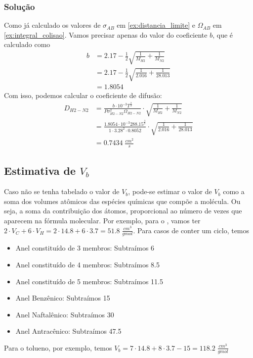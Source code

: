 \subsubsection{Solução}
Como já calculado os valores de \(\sigma_{AB} \) em \ref{ex:distancia_limite} e \(\Omega_{AB}\) em
\ref{ex:integral_colisao}. Vamos precisar apenas do valor do coeficiente \(b\), que é calculado como
\begin{align}
    b &= 2.17 - \frac{1}{2} \sqrt{\frac{1}{M_{H2}} + \frac{1}{M_{N2} }} \\
    &= 2.17 - \frac{1}{2} \sqrt{\frac{1}{2.016} + \frac{1}{28.013} } \\
    &= 1.8054
\end{align}
Com isso, podemos calcular o coeficiente de difusão:
\begin{align}
    D_{H2-N2} &= \frac{b \cdot 10^{-3} T^{\frac{3}{2}}  }{P \sigma_{H2-N2}^{2} \Omega_{H2-N2}} \cdot \sqrt{\frac{1}{M_{H2}} + \frac{1}{M_{N2} }} \\
    &= \frac{1.8054 \cdot 10^{-3} 288.15^{\frac{3}{2}}  }{1 \cdot 3.28^{2} \cdot 0.8052} \cdot \sqrt{\frac{1}{2.016} + \frac{1}{28.013} } \\
    &= 0.7434 \; \frac{cm^2}{s}
\end{align}

\subsection{Estimativa de \(V_b\) }
Caso não se tenha tabelado o valor de \(V_b\), pode-se estimar o valor de \(V_b\) como a soma dos
volumes atômicos das espécies químicas que compõe a molécula. Ou seja, a soma da contribuição dos
átomos, proporcional ao número de vezes que aparecem na fórmula molecular. Por exemplo, para o
, vamos ter \(2 \cdot V_{C} + 6 \cdot V_{H} = 2 \cdot 14.8 + 6 \cdot  3.7 = 51.8 \;
\frac{cm^{3}}{gmol}\). Para casos de conter um ciclo, temos
\begin{itemize}
    \item Anel constituído de 3 membros: Subtraímos 6
    \item Anel constituído de 4 membros: Subtraímos 8.5
    \item Anel constituído de 5 membros: Subtraímos 11.5
    \item Anel Benzênico: Subtraímos 15
    \item Anel Naftalênico: Subtraímos 30
    \item Anel Antracênico: Subtraímos 47.5
\end{itemize}
Para o tolueno, por exemplo, temos \(V_{b} = 7 \cdot 14.8 + 8 \cdot 3.7 - 15 = 118.2 \;
\frac{cm^{3}}{gmol}\)

